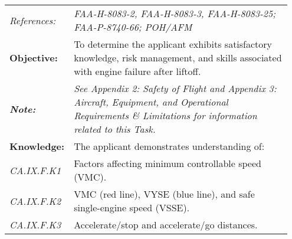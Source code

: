 {\begin{table}[H]
\centering
\begin{tabular}%
  {>{\raggedleft\arraybackslash}p{0.15\linewidth}%
   >{\raggedright\arraybackslash}p{0.8\linewidth}%
  }
\textit{References:}                                                                    & \textit{FAA-H-8083-2, FAA-H-8083-3, FAA-H-8083-25; FAA-P-8740-66; POH/AFM}                                                                                                                                                 \\
\textbf{Objective:}                                                                     & To determine the applicant exhibits satisfactory knowledge, risk management, and skills associated with engine failure after liftoff.                                                                                      \\
\textit{\textbf{Note:}}                                                                 & \textit{See Appendix 2: Safety of Flight and Appendix 3: Aircraft, Equipment, and Operational Requirements \& Limitations for information related to this Task.}                                                           \\ \hline
\textbf{Knowledge:}                                                                     & The applicant demonstrates understanding of:                                                                                                                                                                               \\
\textit{CA.IX.F.K1}                                                                     & Factors affecting minimum controllable speed (VMC).                                                                                                                                                                        \\
\textit{CA.IX.F.K2}                                                                     & VMC (red line), VYSE (blue line), and safe single-engine speed (VSSE).                                                                                                                                                     \\
\textit{CA.IX.F.K3}                                                                     & Accelerate/stop and accelerate/go distances.                                                                                                                                                                               \\

\end{tabular}
\end{table}}
